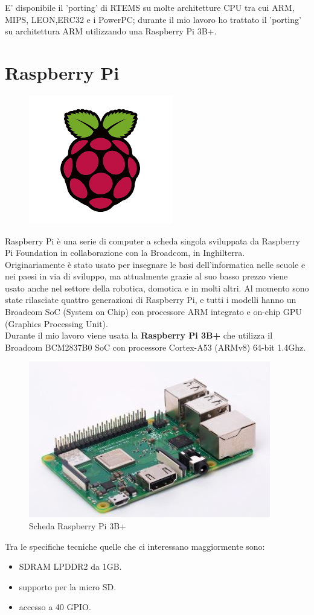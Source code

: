 \documentclass[12pt, a4paper, titlepage, oneside]{book}
\begin{document}
\begin{flushleft}
E' disponibile il 'porting' di RTEMS su molte architetture CPU tra cui ARM, MIPS, LEON,ERC32 e i PowerPC; durante il mio lavoro ho trattato il 'porting' su architettura ARM utilizzando una Raspberry Pi 3B+.
\section{Raspberry Pi}
\begin{figure}[h]
    \centering
    \includegraphics[scale = 0.70]{raspberrypiLogo.png}
\end{figure}
Raspberry Pi è una serie di computer a scheda singola sviluppata da Raspberry Pi Foundation in collaborazione con la Broadcom, in Inghilterra.\\
Originariamente è stato usato per insegnare le basi dell'informatica nelle scuole e nei paesi in via di sviluppo, ma attualmente grazie al suo basso prezzo viene usato anche nel settore della robotica, domotica e in molti altri.
Al momento sono state rilasciate quattro generazioni di Raspberry Pi, e tutti i modelli hanno un Broadcom SoC (System on Chip) con processore ARM integrato e on-chip GPU (Graphics Processing Unit).\\
Durante il mio lavoro viene usata la \textbf{Raspberry Pi 3B+} che utilizza il Broadcom BCM2837B0 SoC \cite{bcm2837} con processore Cortex-A53 (ARMv8) 64-bit 1.4Ghz.
\newpage
\begin{figure} [h]
    \centering
    \includegraphics[scale = 1.25]{RPi3B.JPG}
    \caption{Scheda Raspberry Pi 3B+}
    \label{fig:RPI3B_laver}
\end{figure}
Tra le specifiche tecniche quelle che ci interessano maggiormente sono:
\begin{itemize}
    \item SDRAM LPDDR2 da 1GB.
    \item supporto per la micro SD.
    \item accesso a 40 GPIO.
\end{itemize}


\end{flushleft}
\end{document}
